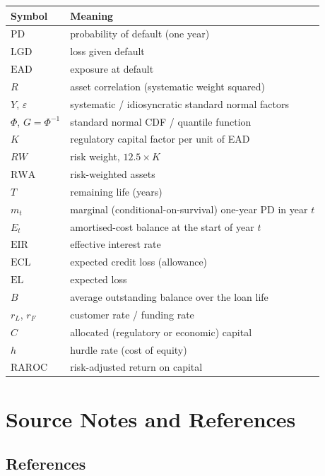 \documentclass[11pt,a4paper]{report}
\theoremstyle{definition}
\theoremstyle{plain}
\newcommand{\PD}{\mathrm{PD}}
\newcommand{\LGD}{\mathrm{LGD}}
\newcommand{\EAD}{\mathrm{EAD}}
\newcommand{\RWA}{\mathrm{RWA}}
\newcommand{\EL}{\mathrm{EL}}
\newcommand{\EIR}{\mathrm{EIR}}
\newcommand{\ECL}{\mathrm{ECL}}
\newcommand{\raroc}{\mathrm{RAROC}}
\begin{document}
\begin{center}
\begin{tabular}{ll}
\toprule
Symbol & Meaning\\
\midrule
$\PD$ & probability of default (one year)\\
$\LGD$ & loss given default\\
$\EAD$ & exposure at default\\
$R$ & asset correlation (systematic weight squared)\\
$Y$, $\varepsilon$ & systematic / idiosyncratic standard normal factors\\
$\Phi$, $G=\Phi^{-1}$ & standard normal CDF / quantile function\\
$K$ & regulatory capital factor per unit of EAD\\
$RW$ & risk weight, $12.5\times K$\\
$\RWA$ & risk-weighted assets\\
$T$ & remaining life (years)\\
$m_t$ & marginal (conditional-on-survival) one-year PD in year $t$\\
$E_t$ & amortised-cost balance at the start of year $t$\\
$\EIR$ & effective interest rate\\
$\ECL$ & expected credit loss (allowance)\\
$\EL$ & expected loss\\
$B$ & average outstanding balance over the loan life\\
$r_L$, $r_F$ & customer rate / funding rate\\
$C$ & allocated (regulatory or economic) capital\\
$h$ & hurdle rate (cost of equity)\\
$\raroc$ & risk-adjusted return on capital\\
\bottomrule
\end{tabular}
\end{center}

\chapter{Source Notes and References}

\section*{References}
\end{document}
